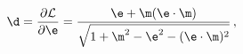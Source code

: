 \begin{equation}
\d=\frac{\partial {\cal L}}{\partial \e}=\frac{\e+\m (\e\cdot\m)}{\sqrt{1+
{\m}^2-{\e}^2-(\e\cdot \m)^2}}\, ,
\label{bi5}
\end{equation}

